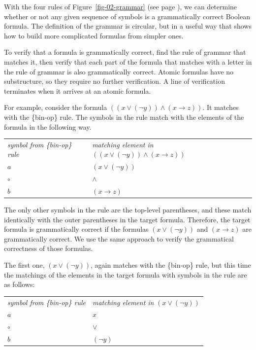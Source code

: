 With the four rules of Figure~\ref{fig-02-grammar} (see page \pageref{fig-02-grammar}),
we can determine whether or not any given sequence of symbols is a grammatically correct Boolean formula.
The definition of the grammar is circular, but in a useful way that shows how to build more complicated formulas from simpler ones.

To verify that a formula is grammatically correct, find the rule of grammar that matches it, then verify that each part of the formula that matches with a letter in the rule of grammar is also grammatically correct. Atomic formulas have no substructure, so they require no further verification. A line of verification terminates when it arrives at an atomic formula.

For example, consider the formula $((x \vee (\neg y)) \wedge (x \rightarrow z))$. It matches with the \{bin-op\} rule. The symbols in the rule match with the elements of the formula in the following way.
\begin{center}
\begin{tabular}{ll}
\emph{symbol from \{bin-op\} rule}      & \emph{matching element in} $((x \vee (\neg y)) \wedge (x \rightarrow z))$ \\
$a$                                     & $(x \vee (\neg y))$ \\
$\circ$                                 & $\wedge$ \\
$b$                                     & $(x \rightarrow z)$ \\
\end{tabular}
\end{center}

The only other symbols in the rule are the top-level parentheses, and these match identically with the outer parentheses in the target formula. Therefore, the target formula is grammatically correct if the formulas $(x \vee (\neg y))$ and $(x \rightarrow z)$  are grammatically correct. We use the same approach to verify the grammatical correctness of those formulas.

The first one, $(x \vee (\neg y))$, again matches with the \{bin-op\} rule, but this time the matchings of the elements in the target formula with symbols in the rule are as follows:
\begin{center}
\begin{tabular}{ll}
\emph{symbol from \{bin-op\} rule}      & \emph{matching element in}  $(x \vee (\neg y))$ \\
$a$                                     & $x$ \\
$\circ$                                 & $\vee$ \\
$b$                                     & $(\neg y)$ \\
\end{tabular}
\end{center}

